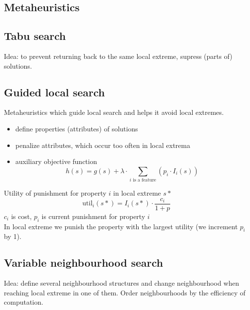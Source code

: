 \begin{multicols}{5}
\section{Metaheuristics}
\subsection{Tabu search}
Idea: to prevent returning back to the same local extreme, supress (parts of) solutions.
\subsection{Guided local search}
Metaheuristics which guide local search and helps it avoid local extremes.
\begin{itemize}
	\item define properties (attributes) of solutions
	\item penalize attributes, which occur too often in local extrema
	\item auxiliary objective function
		\[h(s) = g(s) + \lambda \cdot \sum_{i\text{ is a feature}}(p_i\cdot I_i(s))\]
\end{itemize}
Utility of punishment for property $i$ in local extreme $s*$
\[
	\text{util}_i(s*) = I_i(s*) \cdot \frac{c_i}{1+p}
\]
$c_i$ is cost, $p_i$ is current punishment for property $i$ \\
In local extreme we punish the property with the largest utility (we increment $p_i$ by 1).
\subsection{Variable neighbourhood search}
Idea: define several neighbourhood structures and change neighbourhood when reaching local extreme
in one of them. Order neighbourhoods by the efficiency of computation.

\end{multicols}

